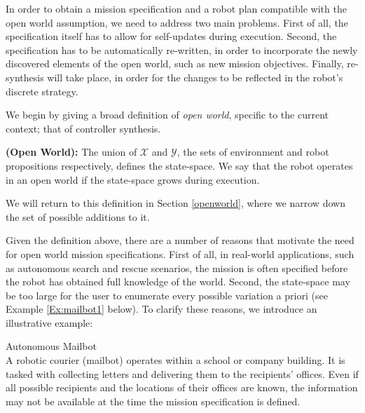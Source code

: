 In order to obtain a mission specification and a robot plan compatible with the open world assumption, we need to address two main problems. First of all, the specification itself has to allow for self-updates during execution. Second, the specification has to be automatically re-written, in order to incorporate the newly discovered elements of the open world, such as new mission objectives. Finally, re-synthesis will take place, in order for the changes to be reflected in the robot's discrete strategy.

We begin by giving a broad definition of \emph{open world}, specific to the current context; that of controller synthesis.

\begin{myDefinition}
	\textbf{(Open World):} The union of $\mathcal{X}$ and $\mathcal{Y}$, the sets of environment and robot propositions respectively, defines the state-space. We say that the robot operates in an open world if the state-space grows during execution.
	\end{myDefinition} 
We will return to this definition in Section \ref{openworld}, where we narrow down the set of possible additions to it.

Given the definition above, there are a number of reasons that motivate the need for open world mission specifications. First of all, in real-world applications, such as autonomous search and rescue scenarios, the mission is often specified before the robot has obtained full knowledge of the world. Second, the state-space may be too large for the user to enumerate every possible variation a priori (see Example \ref{Ex:mailbot1} below).  To clarify these reasons, we introduce an illustrative example:

\begin{myExample}\label{Ex:mailbot1} Autonomous Mailbot\\
	A robotic courier (mailbot) operates within a school or company building. It is tasked with collecting letters and delivering them to the recipients' offices. Even if all possible recipients and the locations of their offices are known, the information may not be available at the time the mission specification is defined. 
\end{myExample}


